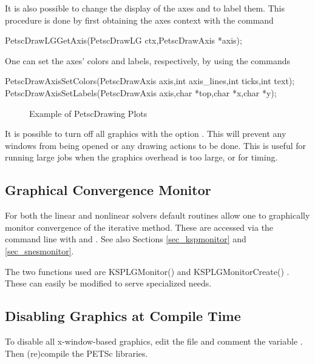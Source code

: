 {{{It is also possible to change the display of the axes and to label
them. This procedure is done by first obtaining the axes context with the 
command  
\begin{tabbing}
  PetscDrawLGGetAxis(PetscDrawLG ctx,PetscDrawAxis *axis);
\end{tabbing}
One can set the axes' colors and labels, respectively, by using the
commands  
\begin{tabbing}
  PetscDrawAxisSetColors(PetscDrawAxis axis,int axis\_lines,int ticks,int text);\\
  PetscDrawAxisSetLabels(PetscDrawAxis axis,char *top,char *x,char *y);
\end{tabbing}

\begin{figure}[H]
{\small
{}
}
\caption{Example of PetscDrawing Plots}
\label{fig_plot}
\end{figure}

It is possible to turn off all graphics with the option 
. This
will prevent any windows from being opened or any drawing actions to be done.
This is useful for running large jobs when the graphics overhead is too
large, or for timing.

\subsection{Graphical Convergence Monitor}
For both the linear and nonlinear solvers default routines
allow one to graphically monitor convergence of the iterative method.
These are accessed via the command line with 
 and . 
 See also Sections \ref{sec_kspmonitor} and
\ref{sec_snesmonitor}. 

The two functions used are KSPLGMonitor() 
and KSPLGMonitorCreate()  . These 
can easily be modified to serve specialized needs.


\subsection{Disabling Graphics at Compile Time}

To disable all x-window-based graphics, edit the file
 and comment the variable
.  Then (re)compile the PETSc libraries.


}}}
